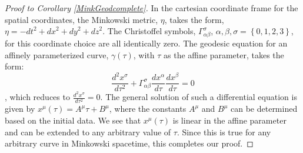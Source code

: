 \documentclass[11pt, a4paper]{report}
\theoremstyle{bfnote}
\begin{document}
\begin{proof}[Proof to Corollary \ref{MinkGeodcomplete}] 
    In the cartesian coordinate frame for the spatial coordinates, the Minkowski
    metric, $\eta$, takes the form, $\eta = -\textit{dt}^2 + \textit{dx}^2 +
    \textit{dy}^2 + \textit{dz}^2$. The Christoffel symbols,
    $\Gamma^{\sigma}_{\alpha\beta}$, $\alpha, \beta, \sigma = \left\{0, 1, 2,
    3\right\}$, for this coordinate choice are all identically zero. The geodesic
    equation for an affinely parameterized curve, $\gamma\left(\tau\right)$,
    with $\tau$ as the affine parameter, takes the form:
    \begin{equation*}
        \frac{d^2 x^\sigma}{d\tau^2} + \Gamma^{\sigma}_{\alpha\beta}\frac{dx^\alpha}{d\tau}\dfrac{dx^\beta}{d\tau} = 0
    \end{equation*}
    , which reduces to {\large{$\frac{d^2 x^\sigma}{d\tau^2} = 0$}}. The general solution of
    such a differential equation is given by $x^{\mu}\left(\tau\right) = A^\mu
    \tau + B^\mu$, where the constants $A^\mu$ and $B^\mu$ can be determined
    based on the initial data. We see that $x^\mu\left(\tau\right)$ is linear in
    the affine parameter and can be extended to any arbitrary value of $\tau$.
    Since this is true for any arbitrary curve in Minkowski spacetime, this
    completes our proof.
\end{proof}
\end{document}
